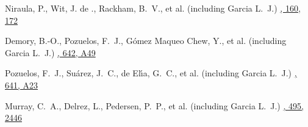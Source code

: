 {Niraula, P., Wit, J. de ., Rackham, B.~V., et al. (including Garcia L.~J.)}
{\href{https://ui.adsabs.harvard.edu/abs/2020AJ....160..172N}{\aj, 160, 172}}

{Demory, B.-O., Pozuelos, F.~J., G{\'o}mez Maqueo Chew, Y., et al. (including Garcia L.~J.)}
{\href{https://ui.adsabs.harvard.edu/abs/2020A\&A...642A..49D}{\aap, 642, A49}}

{Pozuelos, F.~J., Su{\'a}rez, J.~C., de El{\'\i}a, G.~C., et al. (including Garcia L.~J.)}
{\href{https://ui.adsabs.harvard.edu/abs/2020A\&A...641A..23P}{\aap, 641, A23}}

{Murray, C.~A., Delrez, L., Pedersen, P.~P., et al. (including Garcia L.~J.)}
{\href{https://ui.adsabs.harvard.edu/abs/2020MNRAS.495.2446M}{\mnras, 495, 2446}}